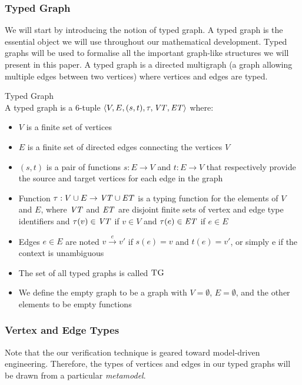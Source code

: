 \subsubsection*{Typed Graph}
We will start by introducing the notion of typed graph. A typed graph is the essential object we will use throughout our mathematical development. Typed graphs will be used to formalise all the important graph-like structures we will present in this paper. A typed graph is a directed multigraph (a graph allowing multiple edges between two vertices) where vertices and edges are typed.


\begin{definition}{Typed Graph\\}
\label{def:typed_graph}
A typed graph is a 6-tuple $\langle V,E,(s,t),\tau, \mathit{VT}, \mathit{ET}\rangle$ where:
\begin{itemize}
\item $V$ is a finite set of vertices
\item $E$ is a finite set of directed edges connecting the vertices $V$
\item $(s,t)$ is a pair of functions $s: E\rightarrow V$ and $t: E\rightarrow V$ that respectively provide the source and target vertices for each edge in the graph
\item Function $\tau:V\cup E\rightarrow \mathit{VT} \cup \mathit{ET}$ is a typing function for the elements of $V$ and $E$, where $\mathit{VT}$ and $\mathit{ET}$ are disjoint finite sets of vertex and edge type identifiers and $\tau(v)\in \mathit{VT}$ if $v\in V$ and $\tau(e)\in \mathit{ET}$ if $e\in E$
\item Edges $e\in E$ are noted $v\xrightarrow{e} v'$ if $s(e)=v$ and $t(e)=v'$, or simply e if the context is unambiguous
\item The set of all typed graphs is called $\textsc{TG}$
\item We define the empty graph to be a graph with $V = \emptyset$, $E = \emptyset$, and the other elements to be empty functions
\end{itemize}
\end{definition}


\subsubsection{Vertex and Edge Types}

Note that the our verification technique is geared toward model-driven engineering. Therefore, the types of vertices and edges in our typed graphs will be drawn from a particular \textit{metamodel}.


